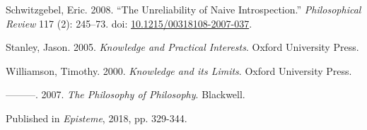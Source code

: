 \documentclass[
  10pt,
  letterpaper,
  DIV=11,
  numbers=noendperiod,
  twoside]{scrartcl}
\newlength{\cslhangindent}
\newenvironment{CSLReferences}[2] %
 {\begin{list}{}{%
  \setlength{\itemindent}{0pt}
  \setlength{\leftmargin}{0pt}
  \setlength{\parsep}{0pt}
  \ifodd #1
   \setlength{\leftmargin}{\cslhangindent}
   \setlength{\itemindent}{-1\cslhangindent}
  \fi
  \setlength{\itemsep}{#2\baselineskip}}}
 {\end{list}}
\begin{document}
\begin{CSLReferences}{1}{0}
Schwitzgebel, Eric. 2008. {``The Unreliability of Naive
Introspection.''} \emph{Philosophical Review} 117 (2): 245--73. doi:
\href{https://doi.org/10.1215/00318108-2007-037}{10.1215/00318108-2007-037}.

Stanley, Jason. 2005. \emph{{Knowledge and Practical Interests}}. Oxford
University Press.

Williamson, Timothy. 2000. \emph{{Knowledge and its Limits}}. Oxford
University Press.

---------. 2007. \emph{{The Philosophy of Philosophy}}. Blackwell.

\end{CSLReferences}



\noindent Published in\emph{
Episteme}, 2018, pp. 329-344.
\end{document}
